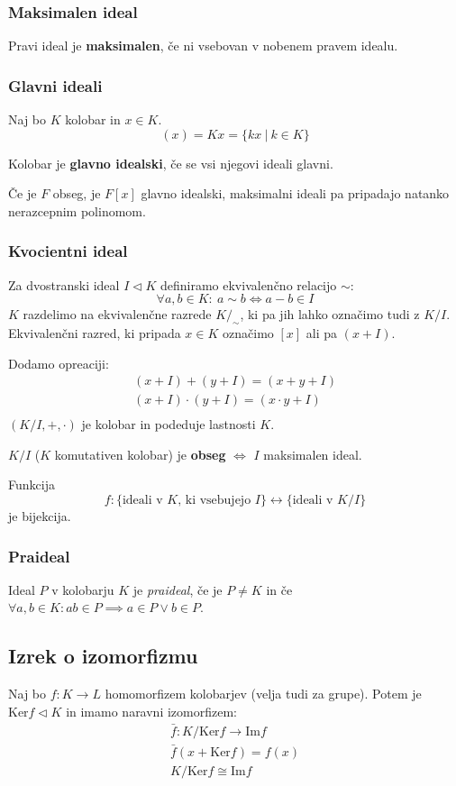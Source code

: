 \subsubsection*{Maksimalen ideal}
Pravi ideal je \textbf{maksimalen}, če ni vsebovan v nobenem pravem idealu.

\subsubsection*{Glavni ideali}
Naj bo $K$ kolobar in $x \in K$.
\[ (x) = Kx = \{kx\ |\ k \in K\}\]

Kolobar je \textbf{glavno idealski}, če se vsi njegovi ideali glavni.

Če je $F$ obseg, je $F[x]$ glavno idealski, maksimalni ideali pa pripadajo natanko nerazcepnim polinomom.

\subsubsection*{Kvocientni ideal}
Za dvostranski ideal $I \lhd K$ definiramo ekvivalenčno relacijo $\sim$:
\[ \forall a,b \in K:\ a \sim b \iff a-b \in I \]
$K$ razdelimo na ekvivalenčne razrede $K/_\sim$, ki pa jih lahko označimo tudi z $K/I$. Ekvivalenčni razred, ki pripada $x \in K$ označimo $[x]$ ali pa $(x+I)$.

Dodamo opreaciji:
\begin{align*}
	(x+I) + (y + I) = (x+y+I) \\
	(x+I) \cdot (y + I) = (x\cdot y+I) \\
\end{align*}
$(K/I, +, \cdot)$ je kolobar in podeduje lastnosti $K$.

$K/I$ ($K$ komutativen kolobar) je \textbf{obseg} $\iff$ $I$ maksimalen ideal.

Funkcija 
\[f: \{\text{ideali v $K$, ki vsebujejo $I$}\} \leftrightarrow \{\text{ideali v $K/I$}\}\] je bijekcija.

\subsubsection*{Praideal}
Ideal $P$ v kolobarju $K$ je \emph{praideal}, če je $P \neq K$ in če $\forall a,b \in K: ab \in P \implies a \in P \vee b \in P$.

\subsection*{Izrek o izomorfizmu}
Naj bo $f: K \to L$ homomorfizem kolobarjev (velja tudi za grupe). Potem je $\text{Ker}f \lhd K$ in imamo naravni izomorfizem:
\begin{align*}
	\bar{f}: K/\text{Ker}f \to \text{Im}f\\
	\bar{f} (x + \text{Ker}f) = f(x) \\
	K/\text{Ker}f \cong \text{Im}f
\end{align*}


